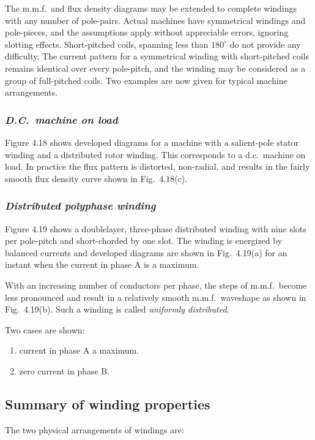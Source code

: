 \documentclass[a4paper,numbers=noenddot,12pt]{scrbook}
\begin{document}
            The m.m.f.\ and flux density diagrams may be extended to complete windings with any number of pole-pairs. Actual machines have symmetrical windings and pole-pieces, and the assumptions apply without appreciable errors, ignoring slotting effects. Short-pitched coils, spanning less than $180^{\circ}$ do not provide any difficulty. The current pattern for a symmetrical winding with short-pitched coils remains identical over every pole-pitch, and the winding may be considered as a group of full-pitched coils.
            Two examples are now given for typical machine arrangements.

            \subsubsection{\textit{D.C.\ machine on load}}
            Figure 4.18 shows developed diagrams for a machine with a salient-pole stator winding and a distributed rotor winding. This corresponds to a d.c.\ machine on load. In practice the flux pattern is distorted, non-radial, and results in the fairly smooth flux density curve shown in Fig.\ 4.18(c). 

            \subsubsection{\textit{Distributed polyphase winding}}
            Figure 4.19 shows a double­layer, three-phase distributed winding with nine slots per pole-pitch and short-chorded by one slot. The winding is energized by balanced currents and developed diagrams are shown in Fig.\ 4.19(a) for an instant when the current in phase A is a maximum. 

            With an increasing number of conductors per phase, the steps of m.m.f.\ become less pronounced and result in a relatively smooth m.m.f.\ waveshape as shown in Fig.\ 4.19(b). Such a winding is called \textit{uniformly distributed}.

            Two cases are shown:
            \begin{enumerate}
                \item current in phase A a maximum.
                \item zero current in phase B.
            \end{enumerate}

            \subsection{Summary of winding properties}
            The two physical arrangements of windings are:
\end{document}
